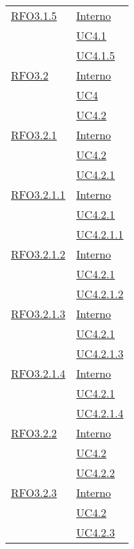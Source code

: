 \begin{longtable}{|>{\centering}m{5cm}|m{5cm}<{\centering}|}
\hyperlink{RFO3.1.5}{RFO3.1.5} &  \hyperlink{Interno}{Interno}\\ &\hyperref[UC4.1]{UC4.1}\\ &\hyperref[UC4.1.5]{UC4.1.5}\\ \hline

\hyperlink{RFO3.2}{RFO3.2} &  \hyperlink{Interno}{Interno}\\ &\hyperref[UC4]{UC4}\\ &\hyperref[UC4.2]{UC4.2}\\ \hline

\hyperlink{RFO3.2.1}{RFO3.2.1} &  \hyperlink{Interno}{Interno}\\ &\hyperref[UC4.2]{UC4.2}\\ &\hyperref[UC4.2.1]{UC4.2.1}\\ \hline

\hyperlink{RFO3.2.1.1}{RFO3.2.1.1} & \hyperlink{Interno}{Interno}\\ &\hyperref[UC4.2.1]{UC4.2.1}\\ &\hyperref[UC4.2.1.1]{UC4.2.1.1}\\ \hline

\hyperlink{RFO3.2.1.2}{RFO3.2.1.2} &  \hyperlink{Interno}{Interno}\\ &\hyperref[UC4.2.1]{UC4.2.1}\\ &\hyperref[UC4.2.1.2]{UC4.2.1.2}\\ \hline

\hyperlink{RFO3.2.1.3}{RFO3.2.1.3} & \hyperlink{Interno}{Interno}\\ &\hyperref[UC4.2.1]{UC4.2.1}\\ &\hyperref[UC4.2.1.3]{UC4.2.1.3}\\ \hline

\hyperlink{RFO3.2.1.4}{RFO3.2.1.4} &  \hyperlink{Interno}{Interno}\\ &\hyperref[UC4.2.1]{UC4.2.1}\\ &\hyperref[UC4.2.1.4]{UC4.2.1.4}\\ \hline

\hyperlink{RFO3.2.2}{RFO3.2.2} &\hyperlink{Interno}{Interno}\\ &\hyperref[UC4.2]{UC4.2}\\ &\hyperref[UC4.2.2]{UC4.2.2}\\ \hline

\hyperlink{RFO3.2.3}{RFO3.2.3} &  \hyperlink{Interno}{Interno}\\ &\hyperref[UC4.2]{UC4.2}\\ &\hyperref[UC4.2.3]{UC4.2.3}\\ \hline


\end{longtable}
